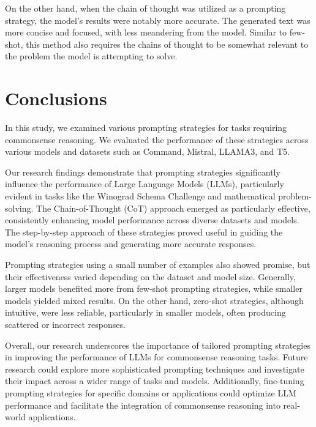 \documentclass[fleqn,moreauthors,10pt]{ds_report}
\begin{document}
On the other hand, when the chain of thought was utilized as a prompting strategy, the model's results were notably more accurate. The generated text was more concise and focused, with less meandering from the model. Similar to few-shot, this method also requires the chains of thought to be somewhat relevant to the problem the model is attempting to solve.

\section*{Conclusions}
In this study, we examined various prompting strategies for tasks requiring commonsense reasoning. We evaluated the performance of these strategies across various models and datasets such as Command, Mistral, LLAMA3, and T5.

Our research findings demonstrate that prompting strategies significantly influence the performance of Large Language Models (LLMs), particularly evident in tasks like the Winograd Schema Challenge and mathematical problem-solving. The Chain-of-Thought (CoT) approach emerged as particularly effective, consistently enhancing model performance across diverse datasets and models. The step-by-step approach of these strategies proved useful in guiding the model's reasoning process and generating more accurate responses.

Prompting strategies using a small number of examples also showed promise, but their effectiveness varied depending on the dataset and model size. Generally, larger models benefited more from few-shot prompting strategies, while smaller models yielded mixed results. On the other hand, zero-shot strategies, although intuitive, were less reliable, particularly in smaller models, often producing scattered or incorrect responses.

Overall, our research underscores the importance of tailored prompting strategies in improving the performance of LLMs for commonsense reasoning tasks. Future research could explore more sophisticated prompting techniques and investigate their impact across a wider range of tasks and models. Additionally, fine-tuning prompting strategies for specific domains or applications could optimize LLM performance and facilitate the integration of commonsense reasoning into real-world applications.
\end{document}

